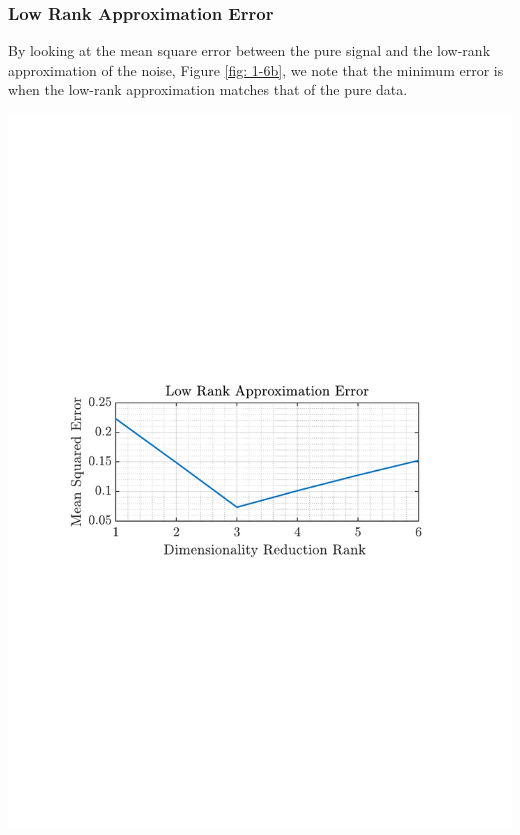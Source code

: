 \documentclass[12pt]{article}
\begin{document}
 	
 	\subsubsection{Low Rank Approximation Error}
 	\begin{minipage}[b]{0.49\textwidth}
	By looking at the mean square error between the pure signal and the low-rank approximation of the noise, Figure \ref{fig: 1-6b}, we note that the minimum error is when the low-rank approximation matches that of the pure data.
	\end{minipage}%
	\begin{minipage}{0.04\textwidth}
		\hspace*{0.04\textwidth}
	\end{minipage}%
	\begin{minipage}{0.49\textwidth}
		\centering
		\includegraphics[trim={2.2cm 11.2cm 3.15cm  11.2cm}, clip, width=\textwidth]{../MATLAB/figures/q1_6b_fig01.pdf} 
		\captionsetup{justification=centering}
		\label{fig: 1-6b}
	\end{minipage}%
\end{document}
